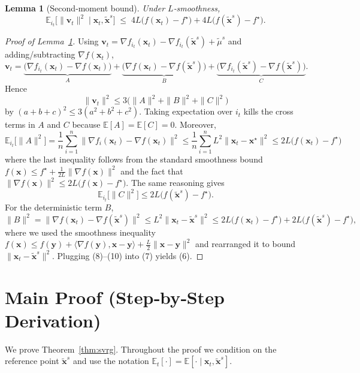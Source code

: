 \documentclass{article}
\newtheorem{lemma}{Lemma}
\begin{document}
\begin{lemma}[Second‑moment bound]\label{lem:secondmoment}
Under $L$‑smoothness,
\[
\mathbb{E}_{i_t}\!\bigl[\|\mathbf{v}_t\|^{2}\mid \mathbf{x}_t,\tilde{\mathbf{x}}^{s}\bigr]
\;\le\;
4L\bigl(f(\mathbf{x}_t)-f^\star\bigr)+4L\bigl(f(\tilde{\mathbf{x}}^{s})-f^\star\bigr).
\tag{6}
\]
\end{lemma}
\begin{proof}[Proof of Lemma~\ref{lem:secondmoment}]
Using $\mathbf{v}_t = \nabla f_{i_t}(\mathbf{x}_t)-\nabla f_{i_t}(\tilde{\mathbf{x}}^{s})+\tilde{\mu}^{s}$ and adding/subtracting $\nabla f(\mathbf{x}_t)$,
\[
\mathbf{v}_t = \underbrace{\bigl(\nabla f_{i_t}(\mathbf{x}_t)-\nabla f(\mathbf{x}_t)\bigr)}_{A}
               +\underbrace{\bigl(\nabla f(\mathbf{x}_t)-\nabla f(\tilde{\mathbf{x}}^{s})\bigr)}_{B}
               +\underbrace{\bigl(\nabla f_{i_t}(\tilde{\mathbf{x}}^{s})-\nabla f(\tilde{\mathbf{x}}^{s})\bigr)}_{C}.
\]
Hence
\[
\|\mathbf{v}_t\|^{2}\le 3\bigl(\|A\|^{2}+\|B\|^{2}+\|C\|^{2}\bigr)
\tag{7}
\]
by $(a+b+c)^{2}\le 3(a^{2}+b^{2}+c^{2})$.  Taking expectation over $i_t$ kills the cross terms in $A$ and $C$ because $\mathbb{E}[A]=\mathbb{E}[C]=0$.  Moreover,
\[
\mathbb{E}_{i_t}\bigl[\|A\|^{2}\bigr]
 = \frac{1}{n}\sum_{i=1}^{n}\|\nabla f_i(\mathbf{x}_t)-\nabla f(\mathbf{x}_t)\|^{2}
 \le \frac{1}{n}\sum_{i=1}^{n}L^{2}\|\mathbf{x}_t-\mathbf{x}^\star\|^{2}
 \le 2L\bigl(f(\mathbf{x}_t)-f^\star\bigr)
\tag{8}
\]
where the last inequality follows from the standard smoothness bound
$f(\mathbf{x})\le f^\star+\frac{1}{2L}\|\nabla f(\mathbf{x})\|^{2}$ and the fact that
$\|\nabla f(\mathbf{x})\|^{2}\le 2L\bigl(f(\mathbf{x})-f^\star\bigr)$.
The same reasoning gives
\[
\mathbb{E}_{i_t}\bigl[\|C\|^{2}\bigr]\le 2L\bigl(f(\tilde{\mathbf{x}}^{s})-f^\star\bigr).
\tag{9}
\]
For the deterministic term $B$,
\[
\|B\|^{2}= \|\nabla f(\mathbf{x}_t)-\nabla f(\tilde{\mathbf{x}}^{s})\|^{2}
 \le L^{2}\|\mathbf{x}_t-\tilde{\mathbf{x}}^{s}\|^{2}
 \le 2L\bigl(f(\mathbf{x}_t)-f^\star\bigr)+2L\bigl(f(\tilde{\mathbf{x}}^{s})-f^\star\bigr),
\tag{10}
\]
where we used the smoothness inequality
$f(\mathbf{x})\le f(\mathbf{y})+\langle\nabla f(\mathbf{y}),\mathbf{x}-\mathbf{y}\rangle+\frac{L}{2}\|\mathbf{x}-\mathbf{y}\|^{2}$
and rearranged it to bound $\|\mathbf{x}_t-\tilde{\mathbf{x}}^{s}\|^{2}$.
Plugging (8)–(10) into (7) yields (6).
\end{proof}

\section*{Main Proof (Step‑by‑Step Derivation)}
We prove Theorem~\ref{thm:svrg}.  Throughout the proof we condition on the reference point
$\tilde{\mathbf{x}}^{s}$ and use the notation $\mathbb{E}_t[\cdot]=\mathbb{E}[\cdot\mid\mathbf{x}_t,\tilde{\mathbf{x}}^{s}]$.
\end{document}
